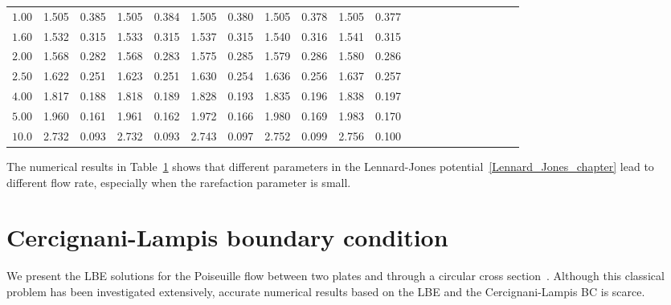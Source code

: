 \begin{table}
\begin{tabular}{ccccccccccccccccccccc}
		$1.00$ & 1.505& 0.385& 1.505& 0.384& 1.505& 0.380& 1.505& 0.378& 1.505& 0.377  \\
		$1.60$ & 1.532& 0.315& 1.533& 0.315& 1.537& 0.315& 1.540& 0.316& 1.541& 0.315  \\
		$2.00$ & 1.568& 0.282& 1.568& 0.283& 1.575& 0.285& 1.579& 0.286& 1.580& 0.286  \\
		$2.50$ & 1.622& 0.251& 1.623& 0.251& 1.630& 0.254& 1.636& 0.256& 1.637& 0.257  \\
		$4.00$ & 1.817& 0.188& 1.818& 0.189& 1.828& 0.193& 1.835& 0.196& 1.838& 0.197  \\
		$5.00$ & 1.960& 0.161& 1.961& 0.162& 1.972& 0.166& 1.980& 0.169& 1.983& 0.170  \\
		$10.0$ & 2.732& 0.093& 2.732& 0.093& 2.743& 0.097& 2.752& 0.099& 2.756& 0.100  \\
		\hline
	\end{tabular} 
	\label{table_poiseuille_lj_mass} 
\end{table}



The numerical results in Table~\ref{table_poiseuille_lj_mass} shows that different parameters in the Lennard-Jones potential~\eqref{Lennard_Jones_chapter} lead to different flow rate, especially when the rarefaction parameter is small. 
 








\section{Cercignani-Lampis boundary condition}


We present the LBE solutions for the Poiseuille flow between two plates and through a circular cross section~\cite{WuStruchtrupJFM2017}. Although this classical problem has been investigated extensively, accurate numerical results based on the LBE and the Cercignani-Lampis  BC is scarce. 

